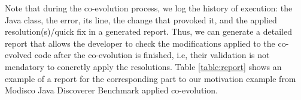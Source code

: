 	
	Note that during the co-evolution process, we log the history of execution: the Java class, the error, its line, the change that provoked it, and the applied resolution(s)/quick fix in a generated report. Thus, we can generate a detailed report that allows the developer to check the modifications applied to the co-evolved code after the co-evolution is finished, i.e, their validation is not mendatory to concretly apply the resolutions.
	Table \ref{table:report} shows an example of a report for the corresponding part to our motivation example from Modisco Java Discoverer Benchmark applied co-evolution. %
	
	
	
	
	
	
